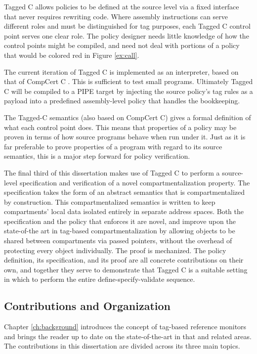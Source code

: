 \documentclass{report}
\begin{document}
Tagged C allows policies to be defined at the source level via a fixed interface
that never requires rewriting code. Where assembly instructions can serve different roles and must
be distinguished for tag purposes, each Tagged C control point serves one clear role. The policy
designer needs little knowledge of how the control points might be compiled, and need not
deal with portions of a policy that would be colored red in Figure \ref{ex:call}.

The current iteration of Tagged C is implemented as an interpreter, based on that of
CompCert C \cite{Leroy09:CompCert}. This is sufficient to test small programs. Ultimately
Tagged C will be compiled to a PIPE target by injecting the source policy's tag rules
as a payload into a predefined assembly-level policy that handles the bookkeeping.

The Tagged-C semantics (also based on CompCert C) gives a formal definition of what each
control point does. This means that properties of a policy may be proven in terms of how
source programs behave when run under it. Just as it is far preferable to prove properties
of a program with regard to its source semantics, this is a major step forward for policy
verification.

The final third of this dissertation makes use of Tagged C to perform a source-level specification and
verification of a novel compartmentalization property. The specification takes the form of
an abstract semantics that is compartmentalized by construction. This compartmentalized semantics
is written to keep compartments' local data isolated entirely in separate address spaces.
Both the specification and the policy that enforces it are novel, and improve upon the
state-of-the art in tag-based compartmentalization by allowing objects to be shared between
compartments via passed pointers, without the overhead of protecting every object individually.
The proof is mechanized. The policy definition, its
specification, and its proof are all concrete contributions on their own, and together they
serve to demonstrate that Tagged C is a suitable setting in which to perform the entire
define-specify-validate sequence.

\subsection{Contributions and Organization}

Chapter \ref{ch:background} introduces the concept of tag-based reference monitors
and brings the reader up to date on the state-of-the-art in that and related areas.
The contributions in this dissertation are divided across its three main topics.
\end{document}
